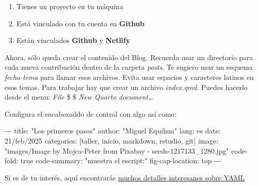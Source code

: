 \documentclass[
  letterpaper,
  DIV=11,
  numbers=noendperiod]{scrartcl}
\newenvironment{Shaded}{\begin{snugshade}}{\end{snugshade}}
\newcommand{\AnnotationTok}[1]{\textcolor[rgb]{0.37,0.37,0.37}{#1}}
\newcommand{\CommentTok}[1]{\textcolor[rgb]{0.37,0.37,0.37}{#1}}
\providecommand{\tightlist}{%
  \setlength{\itemsep}{0pt}\setlength{\parskip}{0pt}}\usepackage{longtable,booktabs,array}
\begin{document}
\begin{tcolorbox}[enhanced jigsaw, colbacktitle=quarto-callout-tip-color!10!white, bottomtitle=1mm, opacityback=0, leftrule=.75mm, toprule=.15mm, arc=.35mm, breakable, coltitle=black, colframe=quarto-callout-tip-color-frame, colback=white, opacitybacktitle=0.6, toptitle=1mm, titlerule=0mm, title=\textcolor{quarto-callout-tip-color}{\faLightbulb}\hspace{0.5em}{Finalmente ¿Cómo quedá todo organizado?}, rightrule=.15mm, bottomrule=.15mm, left=2mm]

\begin{enumerate}
\def\labelenumi{\arabic{enumi}.}
\tightlist
\item
  Tienes un proyecto en tu máquina
\item
  Está vinculado con tu cuenta en \textbf{Github}
\item
  Están vinculados \textbf{Github} y \textbf{Netlify}
\end{enumerate}

Ahora, sólo queda crear el contenido del Blog. Recuerda usar un
directorio para cada nueva contribución dentro de la carpeta
\emph{posts}. Te sugiero usar un esquema \emph{fecha-tema} para llamar
esos archivos. Evita usar espacios y caracteres latinos en esos temas.
Para trabajar hay que crear un archivo \emph{index.qmd}. Puedes hacerlo
desde el menu: \emph{File} \$ \$ \emph{New Quarto document\ldots{}}

Configura el encabezaddo de control con algo así como:

\begin{Shaded}
\begin{Highlighting}[]
\CommentTok{{-}{-}{-}}
\AnnotationTok{title:}\CommentTok{ "Los primeros pasos"}
\AnnotationTok{author:}\CommentTok{ "Miguel Equihua"}
\AnnotationTok{lang:}\CommentTok{ es}
\AnnotationTok{date:}\CommentTok{ 21/feb/2025}
\AnnotationTok{categories:}\CommentTok{ [taller, inicio, markdown, rstudio, git]}
\AnnotationTok{image:}\CommentTok{ "images/Image by Mojca{-}Peter from Pixabay {-} seeds{-}1217133\_1280.jpg"}
\AnnotationTok{code{-}fold:}\CommentTok{ true}
\AnnotationTok{code{-}summary:}\CommentTok{ "muestra el escript:"}
\AnnotationTok{fig{-}cap{-}location:}\CommentTok{ top}
\CommentTok{{-}{-}{-}}
\end{Highlighting}
\end{Shaded}

Si es de tu interés, aquí encontrarás
\href{https://rpubs.com/drgregmartin/1266674}{muchos detalles
interesanes sobre YAML}

\end{tcolorbox}
\end{document}
